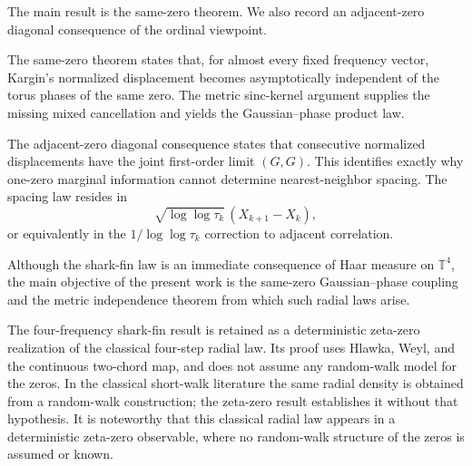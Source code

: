 \documentclass[pdflatex,sn-mathphys-num]{sn-jnl}
\numberwithin{equation}{section}
\theoremstyle{thmstyleone}
\theoremstyle{thmstylethree}
\theoremstyle{thmstyletwo}
\newcommand{\1}{\mathbf 1}
\begin{document}
The main result is the same-zero theorem.  We also record an
adjacent-zero diagonal consequence of the ordinal viewpoint.

The same-zero theorem states that, for almost every fixed frequency vector, Kargin's normalized displacement becomes asymptotically independent of the torus phases of the same zero.  The metric sinc-kernel argument supplies the missing mixed cancellation and yields the Gaussian--phase product law.

The adjacent-zero diagonal consequence states that consecutive normalized displacements have the joint first-order limit $(G,G)$.  This identifies exactly why one-zero marginal information cannot determine nearest-neighbor spacing.  The spacing law resides in
\[
 \sqrt{\log\log\tau_k}\,(X_{k+1}-X_k),
\]
or equivalently in the $1/\log\log\tau_k$ correction to adjacent correlation.

Although the shark-fin law is an immediate consequence of Haar measure on
$\mathbb T^4$, the main objective of the present work is the same-zero
Gaussian--phase coupling and the metric independence theorem from which such
radial laws arise.

The four-frequency shark-fin result is retained as a deterministic
zeta-zero realization of the classical four-step radial law.  Its proof uses
Hlawka, Weyl, and the continuous two-chord map, and does not assume any
random-walk model for the zeros.  In the classical short-walk literature the
same radial density is obtained from a random-walk construction; the zeta-zero
result establishes it without that hypothesis.  It is noteworthy that this
classical radial law appears in a deterministic zeta-zero observable, where no
random-walk structure of the zeros is assumed or known.
\end{document}
